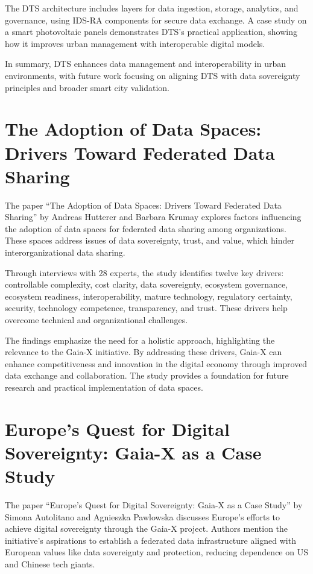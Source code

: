 The DTS architecture includes layers for data ingestion, storage, analytics, and governance, using IDS-RA components for secure data exchange.
A case study on a smart photovoltaic panels demonstrates DTS's practical application, showing how it improves urban management with interoperable digital models.

In summary, DTS enhances data management and interoperability in urban environments, with future work focusing on aligning DTS with data sovereignty principles and broader smart city validation.

\section{The Adoption of Data Spaces: Drivers Toward Federated Data Sharing}\label{sec:the-adoption-of-data-spaces:-drivers-toward-federated-data-sharing}

The paper ``The Adoption of Data Spaces: Drivers Toward Federated Data Sharing'' by Andreas Hutterer and Barbara Krumay explores factors influencing the adoption of data spaces for federated data sharing among organizations\cite{adoption_of_data_spaces}.
These spaces address issues of data sovereignty, trust, and value, which hinder interorganizational data sharing.

Through interviews with 28 experts, the study identifies twelve key drivers: controllable complexity, cost clarity, data sovereignty, ecosystem governance, ecosystem readiness, interoperability, mature technology, regulatory certainty, security, technology competence, transparency, and trust.
These drivers help overcome technical and organizational challenges.

The findings emphasize the need for a holistic approach, highlighting the relevance to the Gaia-X initiative.
By addressing these drivers, Gaia-X can enhance competitiveness and innovation in the digital economy through improved data exchange and collaboration.
The study provides a foundation for future research and practical implementation of data spaces.

\section{Europe's Quest for Digital Sovereignty: Gaia-X as a Case Study}\label{sec:europes-quest-for-digital-sovereignty:-gaia-x-as-a-case-study}

The paper ``Europe’s Quest for Digital Sovereignty: Gaia-X as a Case Study'' by Simona Autolitano and Agnieszka Pawlowska discusses Europe's efforts to achieve digital sovereignty through the Gaia-X project\cite{europe_quest_for_digital_sovereignty}.
Authors mention the initiative's aspirations to establish a federated data infrastructure aligned with European values like data sovereignty and protection, reducing dependence on US and Chinese tech giants.


